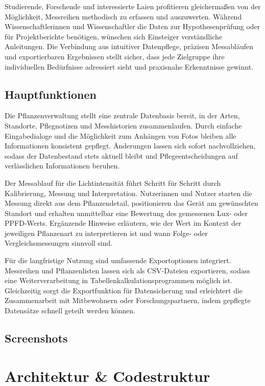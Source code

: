 \documentclass[14pt,a4paper]{report}
\begin{document}
Studierende, Forschende und interessierte Laien profitieren gleichermaßen von der Möglichkeit, Messreihen methodisch zu erfassen und auszuwerten. Während Wissenschaftlerinnen und Wissenschaftler die Daten zur Hypothesenprüfung oder für Projektberichte benötigen, wünschen sich Einsteiger verständliche Anleitungen. Die Verbindung aus intuitiver Datenpflege, präzisen Messabläufen und exportierbaren Ergebnissen stellt sicher, dass jede Zielgruppe ihre individuellen Bedürfnisse adressiert sieht und praxisnahe Erkenntnisse gewinnt.

\section{Hauptfunktionen}
Die Pflanzenverwaltung stellt eine zentrale Datenbasis bereit, in der Arten, Standorte, Pflegnotizen und Messhistorien zusammenlaufen. Durch einfache Eingabedialoge und die Möglichkeit zum Anhängen von Fotos bleiben alle Informationen konsistent gepflegt. Änderungen lassen sich sofort nachvollziehen, sodass der Datenbestand stets aktuell bleibt und Pflegeentscheidungen auf verlässlichen Informationen beruhen.

Der Messablauf für die Lichtintensität führt Schritt für Schritt durch Kalibrierung, Messung und Interpretation. Nutzerinnen und Nutzer starten die Messung direkt aus dem Pflanzendetail, positionieren das Gerät am gewünschten Standort und erhalten unmittelbar eine Bewertung des gemessenen Lux- oder PPFD-Werts. Ergänzende Hinweise erläutern, wie der Wert im Kontext der jeweiligen Pflanzenart zu interpretieren ist und wann Folge- oder Vergleichsmessungen sinnvoll sind.

Für die langfristige Nutzung sind umfassende Exportoptionen integriert. Messreihen und Pflanzenlisten lassen sich als CSV-Dateien exportieren, sodass eine Weiterverarbeitung in Tabellenkalkulationsprogrammen möglich ist. Gleichzeitig sorgt die Exportfunktion für Datensicherung und erleichtert die Zusammenarbeit mit Mitbewohnern oder Forschungspartnern, indem gepflegte Datensätze schnell geteilt werden können.

\section{Screenshots}

\chapter{Architektur \& Codestruktur}
\end{document}
